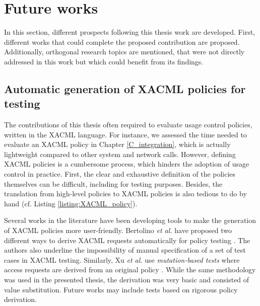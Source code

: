 \section{Future works}
\label{S_future_works}
In this section, different prospects following this thesis work are developed. First, different works that could complete the proposed contribution are proposed. Additionally, orthogonal research topics are mentioned, that were not directly addressed in this work but which could benefit from its findings.
 
\subsection{Automatic generation of XACML policies for testing}
The contributions of this thesis often required to evaluate usage control policies, written in the XACML language. For instance, we assessed the 
time needed to evaluate an XACML policy in Chapter \ref{C_integration}, which is actually lightweight compared to other system and network calls.
However, defining XACML policies is a cumbersome process, which hinders the adoption of usage control in practice. First, the clear and exhaustive  
definition of the policies themselves can be difficult, including for testing purposes.
Besides, the translation from high-level policies to XACML policies is also tedious to do by hand (cf. Listing \ref{listing:XACML_policy}).
 
Several works in the literature have been developing tools to make the generation of XACML policies more user-friendly. Bertolino \emph{et al.} have proposed two different ways 
to derive XACML requests automatically for policy testing \cite{Bertolino2012}. The authors also underline the impossibility of manual specification of a set of test cases in XACML testing. 
Similarly, Xu \emph{et al.} use \emph{mutation-based tests} where access requests are derived from an original policy \cite{Xu2020}. While the same methodology was used in the presented thesis, the derivation was very basic and consisted 
of value substitution. Future works may include tests based on rigorous policy derivation.



